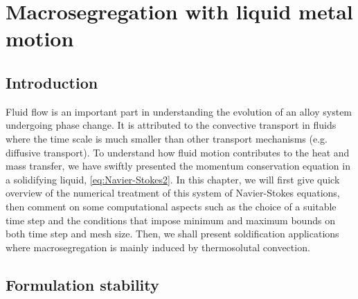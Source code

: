 \chapter{Macrosegregation with liquid metal motion}
\begin{nolinkcolors} 
\minitoc
\end{nolinkcolors}
\newpage

\section{Introduction}

Fluid flow is an important part in understanding the evolution of an alloy system
undergoing phase change. It is attributed to the convective transport in fluids
where the time scale is much smaller than other transport mechanisms (e.g. diffusive transport). 
To understand how fluid motion contributes to the heat and mass transfer, we have 
swiftly presented the momentum conservation equation in a solidifying liquid, \cref{eq:Navier-Stokes2}.
In this chapter, we will first give quick overview of the numerical treatment of this system of 
Navier-Stokes equations, then comment on some computational aspects such as the choice of a suitable time step and
the conditions that impose minimum and maximum bounds on both time step and mesh size. 
Then, we shall present soldification applications
where macrosegregation is mainly induced by thermosolutal convection.

\section{Formulation stability}

